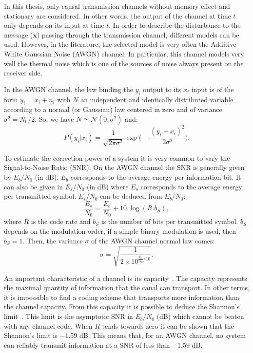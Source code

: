 In this thesis, only causal transmission channels without memory effect and
stationary are considered. In other words, the output of the channel at time $t$
only depends on its input at time $t$. In order to describe the disturbance to
the message ($\bm{x}$) passing through the transmission channel, different
models can be used. However, in the literature, the selected model is very
often the Additive White Gaussian Noise (AWGN) channel. In particular, this
channel models very well the thermal noise which is one of the sources of
noise always present on the receiver side.

In the AWGN channel, the law binding the $y_i$ output to its $x_i$ input is of
the form $y_i = x_i + n_i$ with $N$ an independent and identically distributed
variable according to a normal (or Gaussian) law centered in zero and of
variance $\sigma^2 = N_0 / 2$. So, we have $N \simeq \mathcal{N}(0, \sigma^2)$
and:
\begin{equation}
P(y_i|x_i) = \frac{1}{\sqrt{2\pi\sigma^2}}\exp{\Big(-\frac{(y_i-x_i)^2}{2\sigma^2}\Big)}.
\end{equation}

To estimate the correction power of a system it is very common to vary the
Signal-to-Noise Ratio (SNR). On the AWGN channel the SNR is generally given by
$E_b/N_0$ (in dB). $E_b$ corresponds to the average energy per information bit.
It can also be given in $E_s/N_0$ (in dB) where $E_s$ corresponds to the average
energy per transmitted symbol. $E_s/N_0$ can be deduced from $E_b/N_0$:
\begin{equation}
\frac{E_s}{N_0} = \frac{E_b}{N_0} + 10.\log{(R.b_S)},
\end{equation}
where $R$ is the code rate and $b_S$ is the number of bits per transmitted
symbol. $b_S$ depends on the modulation order, if a simple binary modulation
is used, then $b_S = 1$. Then, the variance $\sigma$ of the AWGN channel normal
law comes:
\begin{equation}
\sigma = \sqrt{\frac{1}{2 \times 10^{\frac{E_s}{N_0} / 10}}}.
\end{equation}

An important characteristic of a channel is its capacity~\cite{Ryan2009}. The
capacity represents the maximal quantity of information that the canal can
transport. In other terms, it is impossible to find a coding scheme that
transports more information than the channel capacity.
From this capacity it is possible to deduce the Shannon's
limit~\cite{Shannon1948}. This limit is the asymptotic SNR in $E_b/N_0$ (dB)
which cannot be beaten with any channel code. When $R$ tends towards zero it can
be shown that the Shannon's limit is $-1.59$ dB. This means that, for an AWGN
channel, no system can reliably transmit information at a SNR of less than
$-1.59$ dB.

